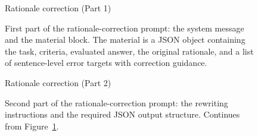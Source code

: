 
\clearpage
\begin{figure}[t]
\begin{promptboxbig}{Rationale correction (Part 1)}
  \ptext{\RationaleCorrectionPartOne}
\end{promptboxbig}
\caption{First part of the rationale-correction prompt: the system message
and the material block. The material is a JSON object containing the task,
criteria, evaluated answer, the original rationale, and a list of
sentence-level error targets with correction guidance.}
\label{fig:rationale-correction-p1}
\end{figure}

\clearpage
\begin{figure}[t]
\begin{promptboxbig}{Rationale correction (Part 2)}
  \ptext{\RationaleCorrectionPartTwo}
\end{promptboxbig}
\caption{Second part of the rationale-correction prompt: the rewriting
instructions and the required JSON output structure. Continues from
Figure~\ref{fig:rationale-correction-p1}.}
\label{fig:rationale-correction-p2}
\end{figure}
